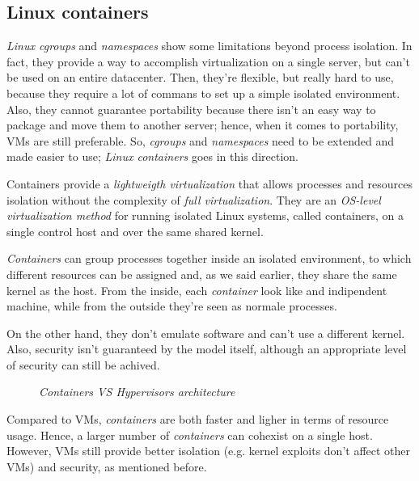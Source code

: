 \subsection{Linux containers}
\emph{Linux cgroups} and \emph{namespaces} show some limitations beyond
process isolation. In fact, they provide a way to accomplish virtualization on
a single server, but can't be used on an entire datacenter. Then, they're
flexible, but really hard to use, because they require a lot of commans to
set up a simple isolated environment. Also, they cannot guarantee portability
because there isn't an easy way to package and move them to another server;
hence, when it comes to portability, VMs are still preferable. So, \emph{cgroups}
and \emph{namespaces} need to be extended and made easier to use; \emph{Linux
containers} goes in this direction.

Containers provide a \emph{lightweigth virtualization} that allows processes and
resources isolation without the complexity of \emph{full virtualization}. They
are an \emph{OS-level virtualization method} for running isolated Linux
systems, called containers, on a single control host and over the same shared
kernel.

\emph{Containers} can group processes together inside an isolated environment,
to which different resources can be assigned and, as we said earlier, they share
the same kernel as the host. From the inside, each \emph{container} look like
and indipendent machine, while from the outside they're seen as normale processes.

On the other hand, they don't emulate software and can't use a different kernel.
Also, security isn't guaranteed by the model itself, although an appropriate
level of security can still be achived.

\begin{figure}[ht!]
    \centering
    \hspace{2.5cm}
    \caption{\emph{Containers VS Hypervisors architecture}}
\end{figure}

\noindent
Compared to VMs, \emph{containers} are both faster and ligher in terms of
resource usage. Hence, a larger number of \emph{containers} can cohexist on
a single host. However, VMs still provide better isolation (e.g. kernel
exploits don't affect other VMs) and security, as mentioned before.


